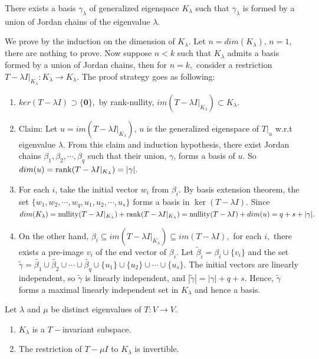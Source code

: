 \begin{theorem}
    There exists a basis $\gamma_\lambda$ of generalized eigenspace $K_\lambda$ such that $\gamma_\lambda$ is formed by a union of Jordan chains of the eigenvalue $\lambda$.
    \label{thm 7.6}
\end{theorem}

\begin{pfbox}
    We prove by the induction on the dimension of $K_\lambda.$ Let $n=dim(K_\lambda),\,n=1,$ there are nothing to prove.
    Now suppose $n<k$ such that $K_\lambda$ admits a basis formed by a union of Jordan chains, then for $n=k,$ consider a restriction $T-\lambda I|_{K_\lambda}: K_\lambda\to K_\lambda.$
    The proof strategy goes as following:
    \begin{enumerate}
        \item $ker(T-\lambda I)\supset\{\mathbf{0}\},$ by rank-nullity, $im(T-\lambda I|_{K_\lambda})\subset K_\lambda.$
        \item Claim: Let $u=im(T-\lambda I|_{K_\lambda}),\, u$ is the generalized eigenspace of $T|_u$ w.r.t eigenvalue $\lambda$. From this claim and induction hypothesis, there exist Jordan chains $\beta_1,\beta_2,\cdots,\beta_q$ such that their union, $\gamma$, forms a basis of $u.$ So $dim(u)=\operatorname{rank}(T-\lambda I|_{K_\lambda})=|\gamma|.$
        \item For each $i$, take the initial vector $w_i$ from $\beta_i.$ By basis extension theorem, the set $\{w_1,w_2,\cdots,w_q,u_1,u_2,\cdots,u_s\}$ forms a basis in $\ker(T-\lambda I).$
        Since $dim(K_\lambda)=\operatorname{nullity}(T-\lambda I|_{K_\lambda})+\operatorname{rank}(T-\lambda I|_{K_\lambda})=\operatorname{nullity}(T-\lambda I)+dim(u)=q+s+|\gamma|.$
        \item On the other hand, $\beta_i\subseteq im(T-\lambda I|_{K_\lambda})\subseteq im(T-\lambda I),$ for each $i,$ there exists a pre-image $v_i$ of the end vector of $\beta_i$. Let $\tilde{\beta}_i = \beta_i\cup\{v_i\}$ and the set $\tilde{\gamma} = \tilde{\beta_1}\cup\tilde{\beta_2}\cup\cdots\cup\tilde{\beta_q}\cup\{u_1\}\cup\{u_2\}\cup\cdots\cup\{u_s\}.$
        The initial vectors are linearly independent, so $\tilde{\gamma}$ is linearly independent, and $|\tilde{\gamma}|=|\gamma|+q+s.$ Hence, $\tilde{\gamma}$ forms a maximal linearly independent set in $K_\lambda$ and hence a basis.
    \end{enumerate}
\end{pfbox}


\begin{theorem}
    Let $\lambda$ and $\mu$ be distinct eigenvalues of $T:V\to V.$
    \begin{enumerate}
        \item $K_\lambda$ is a $T-$invariant subspace.
        \item The restriction of $T-\mu I$ to $K_\lambda$ is invertible.
    \end{enumerate}
\label{thm 7.7}
\end{theorem}

